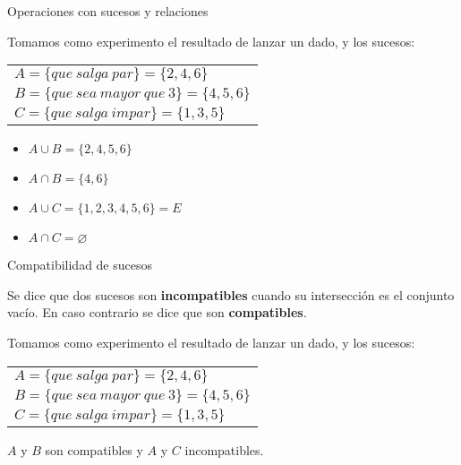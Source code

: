 \documentclass[11pt]{beamer}
\begin{document}
\begin{frame}
{Operaciones con sucesos y relaciones}

 Tomamos como experimento el resultado de lanzar un dado, y los sucesos: \\
\begin{tabular}{l}
$A=\lbrace que\ salga\ par\rbrace=\lbrace2,4,6\rbrace$ \\
$B=\lbrace que\ sea\ mayor\ que\ 3\rbrace=\lbrace4,5,6\rbrace$ \\
$C=\lbrace que\ salga\ impar\rbrace=\lbrace1,3,5\rbrace$
\end{tabular}

\begin{itemize}	
	\item $A\cup B=\lbrace2,4,5,6\rbrace$ \\
	\item $A\cap B=\lbrace4,6\rbrace$\\

	\item $A\cup C=\lbrace1,2,3,4,5,6\rbrace=E$
	\item $A\cap C=\varnothing$
\end{itemize}

\end{frame}


\begin{frame}{Compatibilidad de sucesos}
\begin{block}{}
Se dice que dos sucesos son \textbf{incompatibles} cuando su intersección es el conjunto vacío. En caso contrario se dice que son \textbf{compatibles}.
\end{block}

Tomamos como experimento el resultado de lanzar un dado, y los sucesos: \\
\begin{tabular}{l}
$A=\lbrace que\ salga\ par\rbrace=\lbrace2,4,6\rbrace$ \\
$B=\lbrace que\ sea\ mayor\ que\ 3\rbrace=\lbrace4,5,6\rbrace$ \\
$C=\lbrace que\ salga\ impar\rbrace=\lbrace1,3,5\rbrace$
\end{tabular}

$A$ y $B$ son compatibles y $A$ y $C$ incompatibles.

\end{frame}
\end{document}

